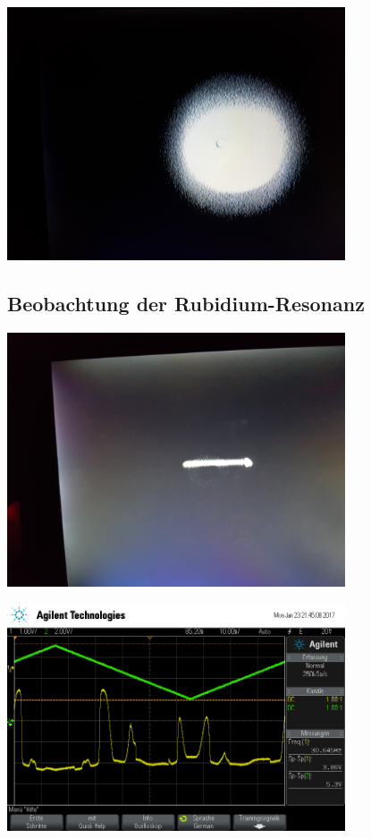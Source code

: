 \documentclass[captions=tableheading]{scrartcl}
\begin{document}
\begin{center}
	\includegraphics[width=10cm]{images/over_threshold.jpg}
	\label{fig:over_threshold}
\end{center}

\subsection{Beobachtung der Rubidium-Resonanz}

\begin{center}
	\includegraphics[width=10cm]{images/resonanz_bild.jpg}
	\label{fig:resonanzbild}
\end{center}

\begin{center}
	\includegraphics[width=10cm]{images/scope_22.png}
	\label{fig:resonanz}
\end{center}
\end{document}
